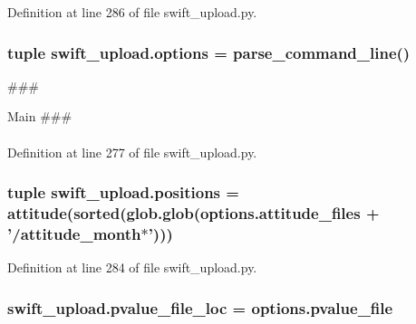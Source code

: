 Definition at line 286 of file swift\-\_\-upload.\-py.

\hypertarget{namespaceswift__upload_a4d388713f6a0d16328488675c4d482a3}{
\subsubsection[{options}]{\setlength{\rightskip}{0pt plus 5cm}tuple swift\-\_\-upload.\-options = {\bf parse\-\_\-command\-\_\-line}()}}\label{namespaceswift__upload_a4d388713f6a0d16328488675c4d482a3}


\begin{DoxyVerb}                        ###
\end{DoxyVerb}
 Main \#\#\# \paragraph*{}



Definition at line 277 of file swift\-\_\-upload.\-py.

\hypertarget{namespaceswift__upload_a377519eb5588b9332f113754e4baa783}{
\subsubsection[{positions}]{\setlength{\rightskip}{0pt plus 5cm}tuple swift\-\_\-upload.\-positions = {\bf attitude}(sorted(glob.\-glob(options.\-attitude\-\_\-files + '/attitude\-\_\-month$\ast$')))}}\label{namespaceswift__upload_a377519eb5588b9332f113754e4baa783}


Definition at line 284 of file swift\-\_\-upload.\-py.

\hypertarget{namespaceswift__upload_abd11718745781fc3b22a4e8afb312c7b}{
\subsubsection[{pvalue\-\_\-file\-\_\-loc}]{\setlength{\rightskip}{0pt plus 5cm}swift\-\_\-upload.\-pvalue\-\_\-file\-\_\-loc = options.\-pvalue\-\_\-file}}\label{namespaceswift__upload_abd11718745781fc3b22a4e8afb312c7b}


